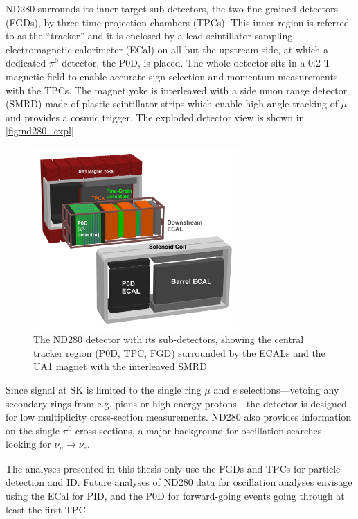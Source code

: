 ND280 surrounds its inner target sub-detectors, the two fine grained detectors (FGDs), by three time projection chambers (TPCs). This inner region is referred to as the ``tracker'' and it is enclosed by a lead-scintillator sampling electromagnetic calorimeter (ECal) on all but the upstream side, at which a dedicated $\pi^0$ detector, the P0D, is placed. The whole detector sits in a 0.2 T magnetic field to enable accurate sign selection and momentum measurements with the TPCs. The magnet yoke is interleaved with a side muon range detector (SMRD) made of plastic scintillator strips which enable high angle tracking of $\mu$ and provides a cosmic trigger. The exploded detector view is shown in \autoref{fig:nd280_expl}.
\begin{figure}[h]
	\includegraphics[width=0.7\textwidth, trim={0mm 0mm 0mm 0mm}, clip,page=1]{figures/det_chap/view/ND280Exploded-Text-Transparent-Large}
	\caption{The ND280 detector with its sub-detectors, showing the central tracker region (P0D, TPC, FGD) surrounded by the ECALs and the UA1 magnet with the interleaved SMRD}
	\label{fig:nd280_expl}
\end{figure}

Since signal at SK is limited to the single ring $\mu$ and $e$ selections---vetoing any secondary rings from e.g. pions or high energy protons---the detector is designed for low multiplicity cross-section measurements. ND280 also provides information on the single $\pi^0$ cross-sections, a major background for oscillation searches looking for $\nu_\mu \rightarrow \nu_e$.

The analyses presented in this thesis only use the FGDs and TPCs for particle detection and ID. Future analyses of ND280 data for oscillation analyses envisage using the ECal for PID, and the P0D for forward-going events going through at least the first TPC.

